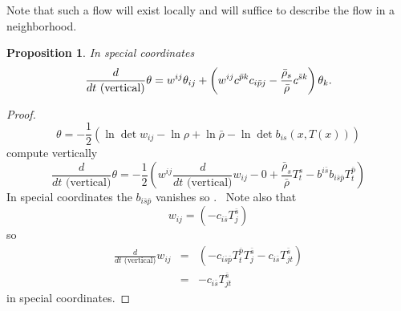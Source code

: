 \documentclass[12pt,letterpaper]{amsart}%
\newcounter{mycounter}
\numberwithin{mycounter}{section}
\theoremstyle{plain}
\newtheorem{proposition}[mycounter]{Proposition}
\numberwithin{equation}{section}
\theoremstyle{definition}
\begin{document}
Note that such a flow will exist locally and will suffice to describe the
flow in a neighborhood. \  

\bigskip 

\begin{proposition}
In special coordinates
\begin{equation*}
\frac{d}{dt\text{ (vertical)}}\theta =w^{ij}\theta _{ij}+\left( w^{ij}c^{%
\bar{p}k}c_{i\bar{p}j}-\frac{\bar{\rho}_{s}}{\bar{\rho}}c^{\bar{s}k}\right)
\theta _{k}.
\end{equation*} 
\end{proposition}

\begin{proof}
\begin{equation*}
\theta =-\frac{1}{2}\left( \ln \det w_{ij}-\ln \rho +\ln \bar{\rho}-\ln \det
b_{is}(x,T(x))\right) 
\end{equation*}%
compute vertically 
\begin{equation*}
\frac{d}{dt\text{ (vertical)}}\theta =-\frac{1}{2}\left( w^{ij}\frac{d}{dt%
\text{ (vertical)}}w_{ij}-0+\frac{\bar{\rho}_{s}}{\bar{\rho}}T_{t}^{s}-b^{i%
\bar{s}}b_{i\bar{s}\bar{p}}T_{t}^{\bar{p}}\right) 
\end{equation*}%
In special coordinates the $b_{i\bar{s}\bar{p}}$ vanishes so . \ Note also
that 
\begin{equation*}
w_{ij}=(-c_{i\bar{s}}T_{j}^{\bar{s}})
\end{equation*}%
so 
\begin{eqnarray*}
\frac{d}{dt\text{ (vertical)}}w_{ij} &=&(-c_{i\bar{s}\bar{p}}T_{t}^{\bar{p}%
}T_{j}^{\bar{s}}-c_{i\bar{s}}T_{jt}^{\bar{s}}) \\
&=&-c_{i\bar{s}}T_{jt}^{\bar{s}}
\end{eqnarray*}%
in special coordinates. 


\end{proof}
\end{document}
